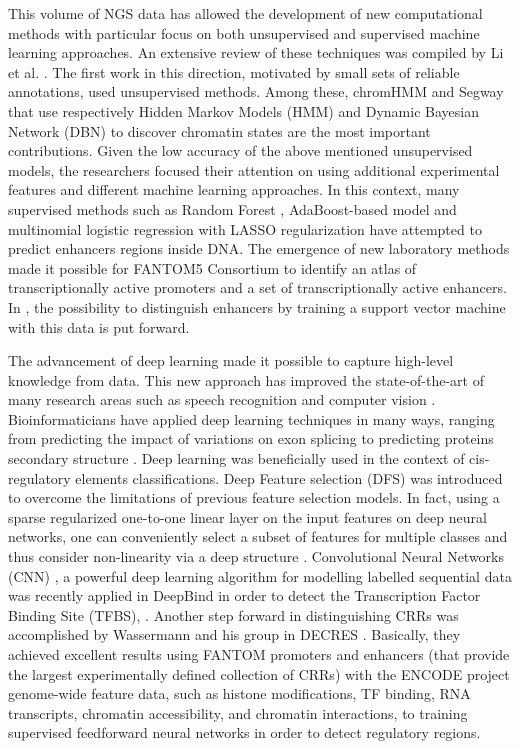 This volume of NGS data has allowed the development of new computational
methods with particular focus on both unsupervised and supervised machine
learning approaches. An extensive review of these techniques was compiled by Li et al. \cite{LiMLReview}. The first work in this direction, motivated by small sets of reliable annotations, used unsupervised methods. Among these, chromHMM \cite{ernst2012chromhmm}
and Segway \cite{HoffmanSegway} that use respectively Hidden Markov Models
(HMM) and Dynamic Bayesian Network (DBN) to discover chromatin states are the most important contributions. Given the low accuracy of the above mentioned unsupervised models, the researchers focused their attention on using additional experimental features and
different machine learning approaches. In this context, many supervised
methods such as Random Forest \cite{RFECS}, AdaBoost-based model
\cite{DELTA_adaboost} and multinomial logistic regression with LASSO
regularization \cite{ChenMultinomialLASSORegression} have attempted to predict enhancers regions inside DNA. The emergence of new
laboratory methods made it possible for FANTOM5 Consortium to identify an
atlas of transcriptionally active promoters and a set of transcriptionally
active enhancers. In \cite{DEEP}, the possibility to distinguish enhancers by
training a support vector machine with this data is put forward.

The advancement of deep learning made it possible to capture
high-level knowledge from data. This new approach has improved
the state-of-the-art of many research areas such as speech recognition and
computer
vision \cite{lecun2015deeplearning}. Bioinformaticians have
applied deep learning techniques in many ways, ranging from predicting the impact
of variations on exon splicing \cite{XiongExon} to predicting proteins
secondary structure \cite{SecondaryStructure}. Deep learning was beneficially used in the context of cis-regulatory elements classifications. 
Deep Feature selection (DFS) was introduced to
overcome the limitations of previous feature selection models. In fact,
using a sparse regularized one-to-one linear layer on the input features
on deep neural networks, one can conveniently select a subset of features
for multiple classes and thus consider non-linearity via a deep
structure \cite{LiYifengDFS}. Convolutional Neural Networks (CNN) \cite{LecunCNN,
MartinezCNN}, a powerful deep learning algorithm for modelling
labelled sequential data was recently applied in DeepBind
\cite{AlipanahiDeepBind} in order to detect the Transcription Factor
Binding Site (TFBS), .
Another step forward in distinguishing CRRs was accomplished by Wassermann
and his group in DECRES \cite{WassermannDECRES}. Basically, they achieved
excellent results using FANTOM promoters and enhancers (that provide the
largest experimentally defined collection of CRRs) with the ENCODE project
genome-wide feature data, such as histone modifications, TF binding, RNA
transcripts, chromatin accessibility, and chromatin interactions, to
training supervised feedforward neural networks in order to detect
regulatory regions.

